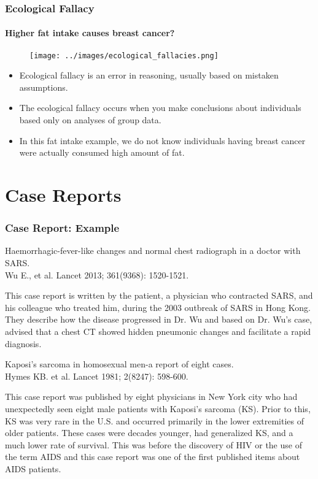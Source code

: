 \documentclass[table,10pt]{beamer}
\begin{document}
\begin{CJK*}{UTF8}{gbsn}
\begin{frame}[t]
\frametitle{Ecological Fallacy}
\framesubtitle{Higher fat intake causes breast cancer?}
\begin{figure}
\texttt{[image: ../images/ecological\_fallacies.png]}
\end{figure}
\begin{itemize}
	\item<1-> Ecological fallacy is an error in reasoning, usually based on 
		mistaken assumptions. 
	\item<2-> The ecological fallacy occurs when you \alert{make conclusions about 
		individuals based only on analyses of group data}. 
	\item<3-> In this fat intake example, we do not know individuals having 
		breast cancer were actually consumed high amount of fat.
\end{itemize}
\end{frame}

\section{Case Reports}

\begin{frame}[t]
\frametitle{Case Report: Example}
{\large \alert{Haemorrhagic-fever-like changes and normal chest radiograph in a doctor with SARS.}\\
\small{Wu E., et al. Lancet 2013; 361(9368): 1520-1521.}}

This case report is written by the patient, a physician who contracted SARS, 
and his colleague who treated him, during the 2003 outbreak of SARS in Hong Kong. 
They describe how the disease progressed in Dr. Wu and based on Dr. Wu’s case, 
advised that a chest CT showed hidden pneumonic changes and facilitate a rapid 
diagnosis.

{\large \alert{Kaposi's sarcoma in homosexual men-a report of eight cases.}}\\
\small{Hymes KB. et al. Lancet 1981; 2(8247): 598-600.}

This case report was published by eight physicians in New York city who had 
unexpectedly seen eight male patients with Kaposi’s sarcoma (KS). Prior to this, 
KS was very rare in the U.S. and occurred primarily in the lower extremities of 
older patients. These cases were decades younger, had generalized KS, and a much 
lower rate of survival. This was before the discovery of HIV or the use of the 
term AIDS and this case report was one of the first published items about AIDS 
patients.
\end{frame}



\end{CJK*}
\end{document}
